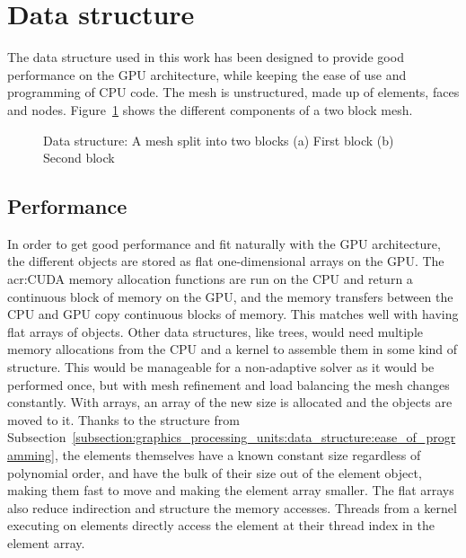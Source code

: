 \section{Data structure} \label{section:graphics_processing_units:data_structure}

The data structure used in this work has been designed to provide good performance on the GPU
architecture, while keeping the ease of use and programming of CPU code. The mesh is unstructured,
made up of elements, faces and nodes. Figure~\ref{fig:mesh_structure} shows the different
components of a two block mesh.

\begin{figure}[H]
	\centering
	\hfill
	\caption{Data structure: A mesh split into two blocks (a) First block (b) Second block}
	\label{fig:mesh_structure}
\end{figure}

\subsection{Performance} \label{subsection:graphics_processing_units:data_structure:performance}

In order to get good performance and fit naturally with the GPU architecture, the different objects
are stored as flat one-dimensional arrays on the GPU. The \acrshort{acr:CUDA} memory allocation
functions are run on the CPU and return a continuous block of memory on the GPU, and the memory
transfers between the CPU and GPU copy continuous blocks of memory. This matches well with having
flat arrays of objects. Other data structures, like trees, would need multiple memory allocations
from the CPU and a kernel to assemble them in some kind of structure. This would be manageable for a
non-adaptive solver as it would be performed once, but with mesh refinement and load balancing the
mesh changes constantly. With arrays, an array of the new size is allocated and the objects are
moved to it. Thanks to the structure from
Subsection~\ref{subsection:graphics_processing_units:data_structure:ease_of_programming}, the
elements themselves have a known constant size regardless of polynomial order, and have the bulk of
their size out of the element object, making them fast to move and making the element array smaller.
The flat arrays also reduce indirection and structure the memory accesses. Threads from a kernel
executing on elements directly access the element at their thread index in the element array.

